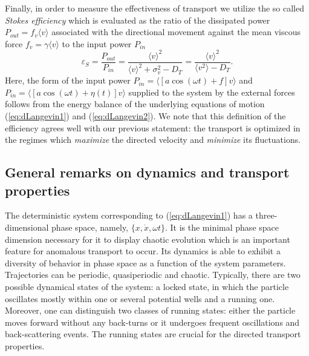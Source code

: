 \documentclass[12pt]{iopart}
\begin{document}
Finally, in order to measure the effectiveness of transport we utilize the so called \emph{Stokes efficiency} \cite{MacKos2004,linke2005,spiechNJP, oster} which 
is evaluated as the ratio of the dissipated power $P_{out} = f_v\langle v \rangle$ associated with the directional movement against the mean viscous force $f_v = \gamma \langle v \rangle$ to the input power $P_{in}$ \cite{MacKos2004}
\begin{equation}
	\varepsilon_S = \frac{P_{out}}{P_{in}} = \frac{\langle v \rangle^2}{\langle v \rangle^2 + \sigma_v^2 - D_T} = \frac{\langle v \rangle^2}{\langle v^2 \rangle - D_T}.
\end{equation}
Here, the form of the input power $P_{in}=\langle [a \cos(\omega t) +f]v\rangle$ and $P_{in}=\langle [a \cos(\omega t) +\eta(t)]v\rangle$ supplied to the system by the external 
forces follows from the energy balance of the underlying equations of motion (\ref{eq:dLangevin1}) and (\ref{eq:dLangevin2}). 
We note that this definition of the efficiency agrees well with our previous statement: the transport is optimized in the regimes which \emph{maximize} the directed velocity and \emph{minimize} its fluctuations. 


\subsection{General remarks on dynamics and transport properties}
The deterministic system corresponding to (\ref{eq:dLangevin1})  
has a three-dimensional phase space, namely, $\{x, \dot x, \omega t\}$. It is the minimal phase space dimension necessary for it to display chaotic evolution which is an important feature for anomalous transport to occur. Its dynamics is able to exhibit a diversity of behavior in phase space as a function of the system parameters. Trajectories can be periodic, quasiperiodic and chaotic. Typically, there are two possible dynamical states of the system: a locked state, in which the particle oscillates mostly within one or several potential wells and a running one.  Moreover, one can distinguish two classes of running states: either the  particle moves forward without any back-turns or it undergoes frequent oscillations and back-scattering events. The running states are crucial for the directed transport properties. 
\end{document}
